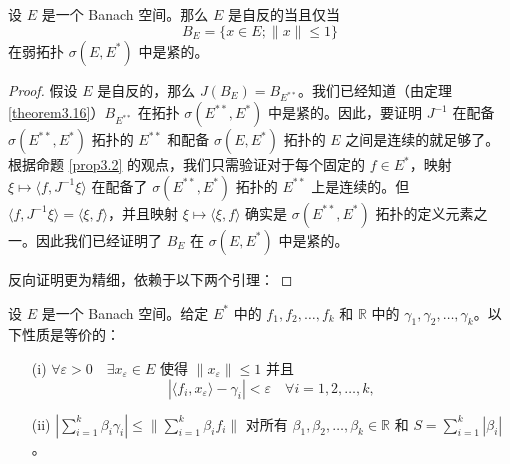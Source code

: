 \begin{theorem}[Kakutani]\label{theorem3.17}
设 $E$ 是一个 Banach 空间。那么 $E$ 是自反的当且仅当
\[ B_E = \{x \in E; \|x\| \le 1\} \]
在弱拓扑 $\sigma(E, E^*)$ 中是紧的。
\end{theorem}

\begin{proof}
假设 $E$ 是自反的，那么 $J(B_E) = B_{E^{**}}$。我们已经知道（由定理 \ref{theorem3.16}）$B_{E^{**}}$ 在拓扑 $\sigma(E^{**}, E^*)$ 中是紧的。因此，要证明 $J^{-1}$ 在配备 $\sigma(E^{**}, E^*)$ 拓扑的 $E^{**}$ 和配备 $\sigma(E, E^*)$ 拓扑的 $E$ 之间是连续的就足够了。根据命题 \ref{prop3.2} 的观点，我们只需验证对于每个固定的 $f \in E^*$，映射 $\xi \mapsto \langle f, J^{-1}\xi \rangle$ 在配备了 $\sigma(E^{**}, E^*)$ 拓扑的 $E^{**}$ 上是连续的。但 $\langle f, J^{-1}\xi \rangle = \langle \xi, f \rangle$，并且映射 $\xi \mapsto \langle \xi, f \rangle$ 确实是 $\sigma(E^{**}, E^*)$ 拓扑的定义元素之一。因此我们已经证明了 $B_E$ 在 $\sigma(E, E^*)$ 中是紧的。

反向证明更为精细，依赖于以下两个引理：

\end{proof}
\begin{lemma}[Helly]\label{lemma3.3}
设 $E$ 是一个 Banach 空间。给定 $E^*$ 中的 $f_1, f_2, \dots, f_k$ 和 $\mathbb{R}$ 中的 $\gamma_1, \gamma_2, \dots, \gamma_k$。以下性质是等价的：
\begin{itemize}
    \item[(i)] $\forall \varepsilon > 0 \quad \exists x_\varepsilon \in E$ 使得 $\|x_\varepsilon\| \le 1$ 并且
    \[ |\langle f_i, x_\varepsilon \rangle - \gamma_i| < \varepsilon \quad \forall i=1, 2, \dots, k, \]
    \item[(ii)] $|\sum_{i=1}^k \beta_i \gamma_i| \le \|\sum_{i=1}^k \beta_i f_i\|$ 对所有 $\beta_1, \beta_2, \dots, \beta_k \in \mathbb{R}$ 和 $S = \sum_{i=1}^k |\beta_i|$。
\end{itemize}
\end{lemma}

